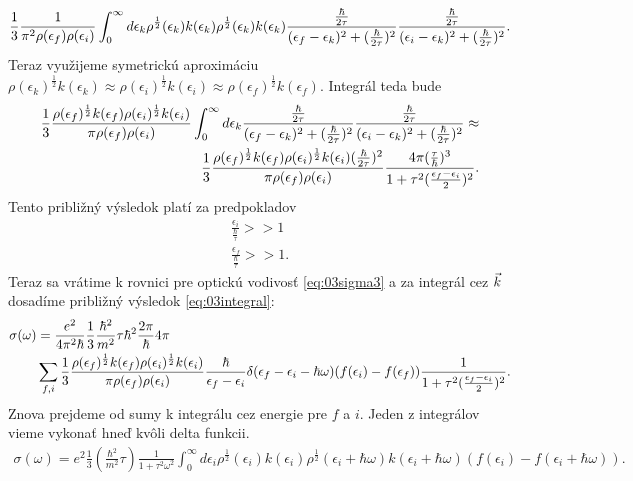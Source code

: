 \begin{align}
\frac{1}{3}\frac{1}{\pi^2\rho(\epsilon_f)\rho(\epsilon_i)}\int_0^\infty d\epsilon_k \rho^{\frac{1}{2}}(\epsilon_k)k(\epsilon_k)\rho^{\frac{1}{2}}(\epsilon_k)k(\epsilon_k)\frac{\frac{\hbar}{2\tau}}{(\epsilon_f-\epsilon_{k})^2+(\frac{\hbar}{2\tau})^2}\frac{\frac{\hbar}{2\tau}}{(\epsilon_i-\epsilon_{k})^2+(\frac{\hbar}{2\tau})^2}\text{.}
\end{align}
Teraz využijeme symetrickú aproximáciu $\rho(\epsilon_k)^{\frac{1}{2}}k(\epsilon_k)\approx\rho(\epsilon_i)^{\frac{1}{2}}k(\epsilon_i)\approx\rho(\epsilon_f)^{\frac{1}{2}}k(\epsilon_f)$. Integrál teda bude
\begin{align}
\label{eq:03integral}
\frac{1}{3}\frac{\rho(\epsilon_f)^{\frac{1}{2}}k(\epsilon_f)\rho(\epsilon_i)^{\frac{1}{2}}k(\epsilon_i)}{\pi\rho(\epsilon_f)\rho(\epsilon_i)}\int_0^\infty d\epsilon_k\frac{\frac{\hbar}{2\tau}}{(\epsilon_f-\epsilon_{k})^2+(\frac{\hbar}{2\tau})^2}\frac{\frac{\hbar}{2\tau}}{(\epsilon_i-\epsilon_{k})^2+(\frac{\hbar}{2\tau})^2}\approx\\ \notag
\frac{1}{3}\frac{\rho(\epsilon_f)^{\frac{1}{2}}k(\epsilon_f)\rho(\epsilon_i)^{\frac{1}{2}}k(\epsilon_i)(\frac{\hbar}{2\tau})^2}{\pi\rho(\epsilon_f)\rho(\epsilon_i)}\frac{4\pi(\frac{\tau}{\hbar})^3}{1+\tau^2(\frac{\epsilon_f-\epsilon_i}{2})^2}\text{.}
\end{align}
Tento približný výsledok platí za  predpokladov
\begin{align*}
\frac{\epsilon_i}{\frac{\hbar}{\tau}} >> 1\\
\frac{\epsilon_f}{\frac{\hbar}{\tau}} >> 1\text{.}
\end{align*}
Teraz sa vrátime k rovnici pre optickú vodivosť \eqref{eq:03sigma3} a za integrál cez $\vec{k}$ dosadíme približný výsledok \eqref{eq:03integral}:
\begin{align}
\notag
\sigma(\omega)&=\frac{e^2}{4\pi^2\hbar}\frac{1}{3}\frac{\hbar^2}{m^2}\tau\hbar^2\frac{2\pi}{\hbar}4\pi\\
&\sum_{f,i}\frac{1}{3}\frac{\rho(\epsilon_f)^{\frac{1}{2}}k(\epsilon_f)\rho(\epsilon_i)^{\frac{1}{2}}k(\epsilon_i)}{\pi\rho(\epsilon_f)\rho(\epsilon_i)}\frac{\hbar}{\epsilon_f-\epsilon_i}\delta(\epsilon_f-\epsilon_i-\hbar\omega)(f(\epsilon_i)-f(\epsilon_f)) \frac{1}{1+\tau^2(\frac{\epsilon_f-\epsilon_i}{2})^2}
\text{.}
\end{align}
Znova prejdeme od sumy k integrálu cez energie pre $f$ a $i$. Jeden z integrálov vieme vykonať hneď kvôli delta funkcii.
\begin{align}
\sigma(\omega)=e^2\frac{1}{3}(\frac{\hbar^2}{m^2}\tau)\frac{1}{1+\tau^2\omega^2}\int_0^\infty d\epsilon_i\rho^{\frac{1}{2}}(\epsilon_i)k(\epsilon_i)\rho^{\frac{1}{2}}(\epsilon_i+\hbar\omega)k(\epsilon_i+\hbar\omega)(f(\epsilon_i)-f(\epsilon_i+\hbar\omega))\text{.}
\end{align}
